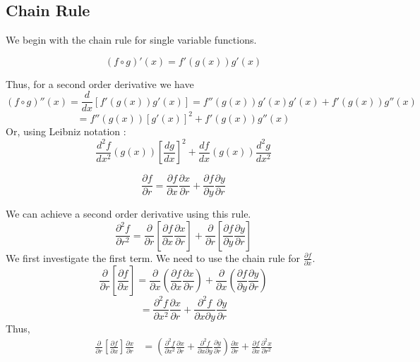 \subsection{Chain Rule}
\label{subsec:Chain Rule}
We begin with the chain rule for single variable functions. 
\begin{ftheo}
    \[
        \left( f \circ g\right) ' (x) = f'(g(x) ) g'(x) 
    \]
    \label{th:Chain Rule Single Variable}
\end{ftheo}
Thus, for a second order derivative we have 
\[
    \left( f\circ g\right) ''(x) = \frac{ d }{ dx } \left[ f'(g(x) ) g'(x)  \right]
    = f''(g(x) ) g'(x) g'(x) + f'(g(x) ) g''(x)     
\]
\[
    = f''(g(x) ) \left[ g'(x) \right] ^2 + f'(g(x) ) g''(x) 
\]
Or, using Leibniz notation : 
\[
    \frac{ d^2 f }{ dx^2 } \left( g(x) \right) \left[ \frac{ dg }{ dx } \right] ^2 +
    \frac{ df }{ dx } \left( g(x) \right) \frac{ d^2g }{ dx^2 } 
\]
\begin{ftheo}
    \[
    \frac{ \partial f }{ \partial r } = \frac{ \partial f }{ \partial x } \frac{ \partial
    x}{ \partial r } + \frac{ \partial f }{ \partial y } \frac{ \partial y }{ \partial r } 
    \]
    \label{th:Chain Rule for Multivariable Functions}
\end{ftheo}
We can achieve a second order derivative using this rule. 
\[
    \frac{ \partial ^2 f }{ \partial r^2 } = \frac{ \partial  }{ \partial r } \left[
    \frac{ \partial f }{ \partial x } \frac{ \partial x }{ \partial r } \right] + \frac{
    \partial  }{ \partial r } \left[ \frac{ \partial f }{ \partial y } \frac{ \partial y
}{ \partial r } \right]
\]
We first investigate the first term. We need to use the chain rule for $ \frac{ \partial f
}{ \partial x }  $. 
\[
    \frac{ \partial  }{ \partial r } \left[ \frac{ \partial f }{ \partial x } \right] = 
    \frac{ \partial  }{ \partial x } \left( \frac{ \partial f }{ \partial x }
        \frac{ \partial x }{ \partial r }\right) + \frac{ \partial  }{ \partial x } \left(\frac{
\partial f }{ \partial y } \frac{ \partial y }{ \partial r } \right)
\]
\[
 = \frac{ \partial ^2 f  }{ \partial x^2  } \frac{ \partial x }{ \partial r } + \frac{
\partial ^2 f }{ \partial x \partial y } \frac{ \partial y }{ \partial r } 
\]
Thus, 
\begin{align*}
    \frac{ \partial  }{ \partial r } \left[ \frac{ \partial f }{ \partial x }\right] \frac{ \partial x
    }{ \partial r } &= \left( \frac{ \partial ^2 f  }{ \partial x^2  } \frac{ \partial x }{ \partial r } + \frac{ \partial ^2 f }{ \partial x \partial y } \frac{ \partial y }{ \partial r } 
    \right) \frac{ \partial x }{ \partial r } + \frac{ \partial f }{ \partial x } \frac{
\partial ^2 x }{ \partial r^2 }  \\ 
\end{align*}

